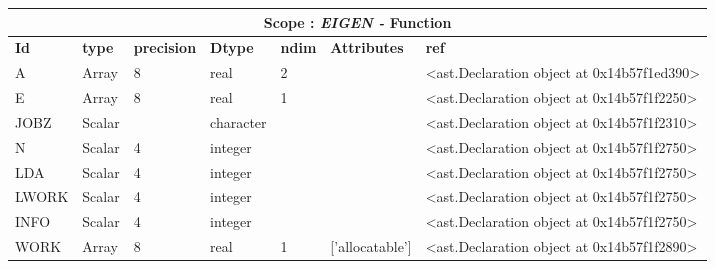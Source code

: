 \documentclass{report}
\begin{document}
\begin{center}
\begin{longtable}{|p{3.5cm}|p{1.5cm}|p{1.5cm}|p{1.5cm}|p{1cm}|p{2cm}|p{4cm}| }
\hline
\multicolumn{7}{|c|}{\textbf{Scope : \qquad}  \textbf{\textit{EIGEN - }Function}}\\ 
\hline
\textbf{Id} & \textbf{type} & \textbf{precision} & \textbf{Dtype} & \textbf{ndim} & \textbf{Attributes} & \textbf{ref} \\\hline

A & Array & 8 & real & 2 &  & <ast.Declaration object at 0x14b57f1ed390> \\\hline

E & Array & 8 & real & 1 &  & <ast.Declaration object at 0x14b57f1f2250> \\\hline

JOBZ & Scalar &  & character &  &  & <ast.Declaration object at 0x14b57f1f2310> \\\hline

N & Scalar & 4 & integer &  &  & <ast.Declaration object at 0x14b57f1f2750> \\\hline

LDA & Scalar & 4 & integer &  &  & <ast.Declaration object at 0x14b57f1f2750> \\\hline

LWORK & Scalar & 4 & integer &  &  & <ast.Declaration object at 0x14b57f1f2750> \\\hline

INFO & Scalar & 4 & integer &  &  & <ast.Declaration object at 0x14b57f1f2750> \\\hline

WORK & Array & 8 & real & 1 & ['allocatable'] & <ast.Declaration object at 0x14b57f1f2890> \\\hline

\end{longtable}
\end{center}

 \vspace{1cm}
\end{document}
